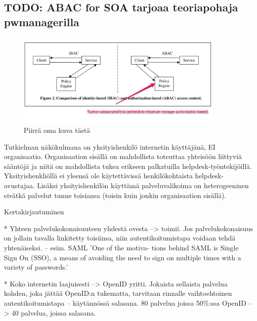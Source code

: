 \documentclass[english,gradu]{tktltiki}
\begin{document}
\begin{description}
         \end{description}


\subsection{TODO: ABAC for SOA tarjoaa teoriapohaja pwmanagerilla} %
\label{sub:todo_abac_for_soa_tarjoaa_teoriapohaja_pwmanagerilla}


  \begin{figure}
    \centering
    \includegraphics[width=0.9\textwidth]{images/abac_for_soa.jpg}
    \caption{Piirrä oma kuva tästä}
    \label{fig:abac_for_soa}
  \end{figure}
  Tutkielman näkökulmana on yksityishenkilö internetin käyttäjänä, EI organisaatio. Organisaation sisällä on mahdollista toteuttaa yhteisöön liittyviä sääntöjä ja niitä on mahdollista tukea erikseen palkatuilla helpdesk-työntekijöillä. Yksityishenkliöllä ei yleensä ole käytettävissä  henkilökohtaista helpdesk-avustajaa. Lisäksi yksityishenkilön käyttämä palveluvalikoima on heterogeeninen eivätkä palvelut tunne toisiansa (toisin kuin jonkin organisaation sisällä).

  Kertakirjautuminen

  * Yhteen palvelukokonaisuuteen yhdestä ovesta --> toimii. Jos palvelukokonaisuus on jollain tavalla linkitetty toisiinsa, niin autentikoitumistapa voidaan tehdä yhtenäiseksi.
  -- esim. SAML
  'One of the motiva- tions behind SAML is Single Sign On (SSO), a means of avoiding the need to sign on multiple times with a variety of passwords.'

  * Koko internetin laajuisesti --> OpenID yritti. Jokaista sellaista palvelua kohden, joka jättää OpenID:n tukematta, tarvitaan rinnalle vaihtoehtoinen autentikoitumistapa -- käytännössä salasana. 80 palvelua joissa 50\%:ssa OpenID --> 40 palvelua, joissa salasana.
\end{document}
